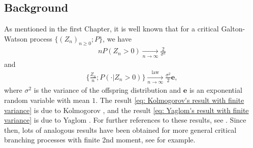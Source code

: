 \documentclass[UTF8]{pkuthss}
\theoremstyle{plain}
\theoremstyle{definition}
\numberwithin{equation}{section}
\begin{document}
\subsection{Background}
	As mentioned in the first Chapter, it is well known that for a critical Galton-Watson process $\{(Z_n)_{n\geq 0}; P\}$, we have
\begin{align}\label{eq: Kolmogorov's result with finite variance}
	n P(Z_n > 0)
	\xrightarrow[n\to \infty]{} \frac{2}{\sigma^2}
\end{align}
	and
\begin{align}\label{eq: Yaglom's result with finite variance}
	\Big\{ \frac{Z_n}{n}; P(\cdot| Z_n > 0) \Big\}
	\xrightarrow[n \to \infty]{\operatorname{law}} \frac{\sigma^2}{2} \mathbf e,
\end{align}
	where $\sigma^2$ is the variance of the offspring distribution and $\mathbf e$ is an exponential random variable with mean $1$.
	The result \eqref{eq: Kolmogorov's result with finite variance} is due to Kolmogorov \cite{Kolmogorov1938Zur-losung}, and the result \eqref{eq: Yaglom's result with finite variance} is due to Yaglom \cite{Yaglom1947Certain}.
	For further references to these results, see 
	\cite{Harris2002The-theory, KestenNeySpitzer1966The-Galton-Watson}.
	Since then, lots of analogous results have been obtained for more general
	critical branching processes with finite 2nd moment, 
	see \cite{AsmussenHering1983Branching, AthreyaNey1974Functionals, AthreyaNey1972Branching, JoffeSpitzer1967On-multitype} for example.
	
\end{document}
